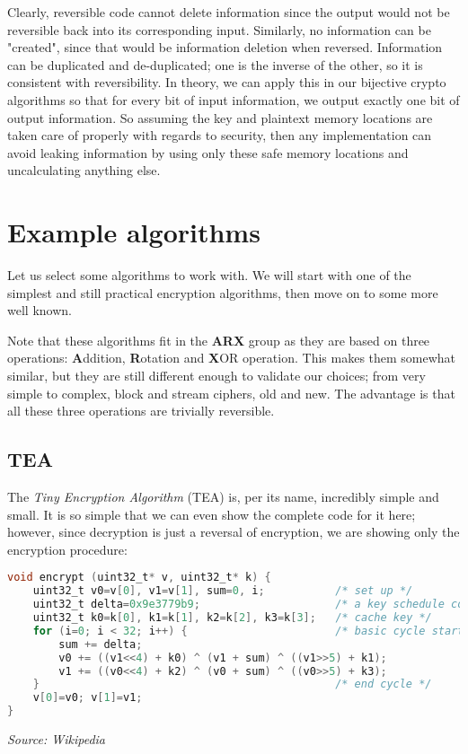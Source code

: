 \documentclass[a4paper,10pt,openright]{memoir}
\newcommand{\term}[1]{\textit{#1}}
\begin{document}
Clearly, reversible code cannot delete information since the output 
would not be reversible back into its corresponding input. Similarly, 
no information can be "created", since that would be information 
deletion when reversed. Information can be duplicated and 
de-duplicated; one is the inverse of the other, so it is consistent 
with reversibility. In theory, we can apply this in our bijective 
crypto algorithms so that for every bit of input information, we output 
exactly one bit of output information. So assuming the key and 
plaintext memory locations are taken care of properly with regards to 
security, then any implementation can avoid leaking information by 
using only these safe memory locations and uncalculating anything else.

\section{Example algorithms}

Let us select some algorithms to work with. We will start with one of 
the simplest and still practical encryption algorithms, then move on to 
some more well known.

Note that these algorithms fit in the \textbf{ARX} group as they are 
based on three operations: \textbf{A}ddition, \textbf{R}otation and 
\textbf{X}OR operation. This makes them somewhat similar, but they are 
still different enough to validate our choices; from very simple to 
complex, block and stream ciphers, old and new. The advantage is that 
all these three operations are trivially reversible.

\subsection{TEA}

The \term{Tiny Encryption Algorithm} (TEA)\cite{tea95} is, per its 
name, incredibly simple and small. It is so simple that we can even 
show the complete code for it here; however, since decryption is just a 
reversal of encryption, we are showing only the encryption procedure:

\begin{lstlisting}[language=C]
void encrypt (uint32_t* v, uint32_t* k) {
    uint32_t v0=v[0], v1=v[1], sum=0, i;           /* set up */
    uint32_t delta=0x9e3779b9;                     /* a key schedule constant */
    uint32_t k0=k[0], k1=k[1], k2=k[2], k3=k[3];   /* cache key */
    for (i=0; i < 32; i++) {                       /* basic cycle start */
        sum += delta;
        v0 += ((v1<<4) + k0) ^ (v1 + sum) ^ ((v1>>5) + k1);
        v1 += ((v0<<4) + k2) ^ (v0 + sum) ^ ((v0>>5) + k3);
    }                                              /* end cycle */
    v[0]=v0; v[1]=v1;
}
\end{lstlisting}
\textit{\footnotesize Source: Wikipedia}\\
\end{document}
